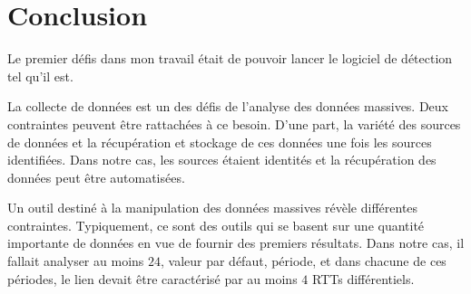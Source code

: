 \section{Conclusion}

Le premier défis dans mon travail était de pouvoir lancer le logiciel de détection tel qu'il est. 
%

La collecte de données est un des défis de l'analyse des données massives. Deux contraintes peuvent être rattachées à ce besoin. D'une part, la variété des sources de données et la récupération et stockage de ces données une fois les sources identifiées. Dans notre cas, les sources étaient identités et la récupération des données peut être automatisées.   

Un outil destiné à la manipulation des données massives révèle différentes contraintes.  Typiquement, ce sont des outils qui se basent sur une quantité importante de données en vue de fournir des premiers résultats. Dans notre cas, il fallait analyser au moins $24$, valeur par défaut, période, et dans chacune de ces périodes, le lien devait être caractérisé par au moins  $4$ RTTs différentiels. 









